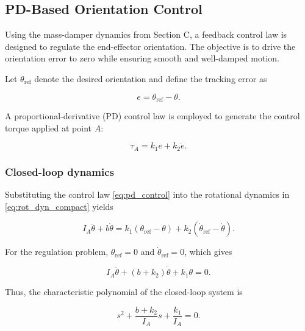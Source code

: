 \documentclass[journal]{IEEEtran}
\begin{document}
\subsection{PD-Based Orientation Control}

Using the mass-damper dynamics from Section C, a feedback control law is designed to regulate the end-effector orientation. The objective is to drive the orientation error to zero while ensuring smooth and well-damped motion.

Let $\theta_{\mathrm{ref}}$ denote the desired orientation and define the tracking error as

\begin{equation}
e = \theta_{\mathrm{ref}} - \theta.
\end{equation}

A proportional-derivative (PD) control law is employed to generate the control torque applied at point $A$:

\begin{equation}
\tau_A = k_1 e + k_2 \dot{e}.
\label{eq:pd_control}
\end{equation}

\subsubsection{Closed-loop dynamics}

Substituting the control law \eqref{eq:pd_control} into the rotational dynamics in \eqref{eq:rot_dyn_compact} yields

\begin{equation}
I_A \ddot{\theta} + b \dot{\theta} = k_1 (\theta_{\mathrm{ref}} - \theta) + k_2 (\dot{\theta}_{\mathrm{ref}} - \dot{\theta}).
\end{equation}

For the regulation problem, $\theta_{\mathrm{ref}} = 0$ and $\dot{\theta}_{\mathrm{ref}} = 0$, which gives

\begin{equation}
I_A \ddot{\theta} + (b + k_2)\dot{\theta} + k_1 \theta = 0.
\end{equation}

Thus, the characteristic polynomial of the closed-loop system is

\begin{equation}
s^2 + \frac{b + k_2}{I_A}s + \frac{k_1}{I_A} = 0.
\end{equation}
\end{document}
